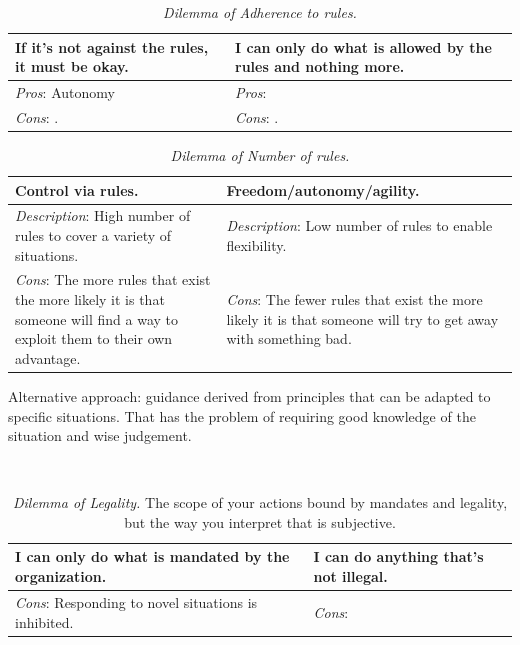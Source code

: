 \begin{center}
\begin{table}[H] %
\begin{tabular}{ | m{\dilemmatablewidth}| m{\dilemmatablewidth} | } 
  \hline
  \textbf{If it's not against the rules, it must be okay.} & 
  \textbf{I can only do what is allowed by the rules and nothing more.} \\ 
  \hline
  \textit{Pros}: Autonomy &
  \textit{Pros}:  \\
  \hline
  \textit{Cons}: . & 
  \textit{Cons}: .  \\  
  \hline
\end{tabular}
\caption{\textit{Dilemma of Adherence to rules.}
}
\label{table:rule_adherence}
\end{table}
\end{center}





\begin{center}
\begin{table}[H] %
\begin{tabular}{ | m{\dilemmatablewidth}| m{\dilemmatablewidth} | } 
  \hline
  \textbf{Control via rules.} & \textbf{Freedom/autonomy/agility.} \\ 
  \hline
  \textit{Description}: High number of rules to cover a variety of situations. & 
  \textit{Description}: Low number of rules to enable flexibility. \\ 
  \hline
  \textit{Cons}: The more rules that exist the more likely it is that someone will find a way to exploit them to their own advantage. & 
  \textit{Cons}: The fewer rules that exist the more likely it is that someone will try to get away with something bad. \\  
  \hline
\end{tabular}
\caption{\textit{Dilemma of Number of rules.}
}
\label{table:number_of_rules}
\end{table}
\end{center}
Alternative approach: guidance derived from principles that can be adapted to specific situations. That has the problem of requiring good knowledge of the situation and wise judgement.

\ \\

\begin{center}
\begin{table}[H] %
\begin{tabular}{ | m{\dilemmatablewidth}| m{\dilemmatablewidth} | } 
  \hline
  \textbf{I can only do what is mandated by the organization.} & 
  \textbf{I can do anything that's not illegal.} \\ 
  \hline
  \textit{Cons}: Responding to novel situations is inhibited. &
  \textit{Cons}:  \\  
  \hline
\end{tabular}
\caption{\textit{Dilemma of Legality.}
The scope of your actions bound by mandates and legality, but the way you interpret that is subjective. 
}
\label{table:legality}
\end{table}
\end{center}
\ \\

